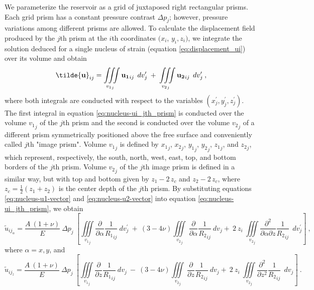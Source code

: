 \documentclass[journal abbreviation, manuscript]{copernicus}
\begin{document}
We parameterize the reservoir as a grid of juxtaposed right rectangular prisms.
Each grid prism has a constant pressure contrast $\Delta p_{j}$; however, pressure variations among different prisms are allowed. 
To calculate the displacement field produced by the $j$th prism
at the $i$th coordinates  $(x_i$, $y_i, z_i)$, we integrate the solution deduced for a single nucleus of strain (equation \ref{eq:displacement_ui})
over its volume and obtain
\begin{equation}
{\bf{\tilde{u}}}_{ij} = 
\iiint\limits_{{v_{1}}_{j}}
{\bf{u_{1}}}_{ij} \: \:  dv_{j}^{\prime}
\: + \:
\iiint\limits_{{v_{2}}_{j}}
{\bf{u_{2}}}_{ij} \:\:  dv_{j}^{\prime} \: ,
\label{eq:nucleus-ui_jth_prism}
\end{equation}
where both integrals are conducted with respect to the variables 
$(x^{\prime}_{j}, y^{\prime}_{j}, z^{\prime}_{j})$. The first integral in equation 
\ref{eq:nucleus-ui_jth_prism} is conducted over the volume ${v_{1}}_{j}$ of the $j$th
prism and the second is conducted over the volume 
${v_{2}}_{j}$ of a different prism symmetrically positioned above the free surface 
and conveniently called $j$th "image prism".
Volume ${v_{1}}_{j}$ is defined by ${x_1}_{j}$, ${x_2}_{j}$, ${y_1}_{j}$, ${y_2}_{j}$,
${z_1}_{j}$, and ${z_2}_{j}$, which represent, respectively, the south, north, west, 
east, top, and bottom borders of the $j$th prism.
Volume ${v_{2}}_{j}$ of the $j$th image prism is defined in a similar way, but with 
top and bottom given by $z_1 - 2 \, z_c$ and $z_2 - 2 \, z_c$, where 
$z_c = \frac{1}{2}(z_1 + z_2)$ is the center depth of the $j$th prism.
By substituting equations \ref{eq:nucleus-u1-vector} and \ref{eq:nucleus-u2-vector} 
into equation \ref{eq:nucleus-ui_jth_prism}, we obtain
\begin{equation}
{\tilde{u}}_{{ij}_\alpha} = \frac{A  \: (1 + \nu)}{E} 
\: \Delta p_{j}  \: \left[ \iiint\limits_{{v_{1}}_{j}} 
\frac{\partial }{\partial \alpha} {\frac{1}{{R_1}_{ij}}} \:  dv_{j}^{\prime} 
\: + \: 
(3  - 4 \nu)  \iiint\limits_{{v_{2}}_{j}}
\: \frac{\partial }{\partial \alpha} {\frac{1}{{R_2}_{ij}}}\:  dv_j
+ \: 2 \: z_{i} \:  \iiint\limits_{{v_{2}}_{j}}
\frac{\partial^{2}  }{\partial \alpha \partial z} {\frac{1}{{R_2}_{ij}}}  \:\:  dv_{j}^{\prime} 
\right] \: , 
\label{eq:u_til_alpha}
\end{equation}
where $\alpha = x, y$, and
\begin{equation}
{\tilde{u}}_{{ij}_z} = \frac{A  \: (1 + \nu)}{E} 
\: \Delta p_{j}  \: \left[ \iiint\limits_{{v_{1}}_{j}}
\frac{\partial }{\partial z} {\frac{1}{{R_1}_{ij}}} \:  dv_j 
\: - \: (3  - 4 \nu)  \iiint\limits_{{v_{2}}_{j}}
\: \frac{\partial }{\partial z} {\frac{1}{{R_2}_{ij}}}\:  dv_j
+ \: 2 \: z_{i} \:  \iiint\limits_{{v_{2}}_{j}}
\frac{\partial^{2}  }{\partial z^{2}} {\frac{1}{{R_2}_{ij}}}  \:\:  dv_j 
\right] \: .
\label{eq:u_til_z}
\end{equation}
\end{document}
